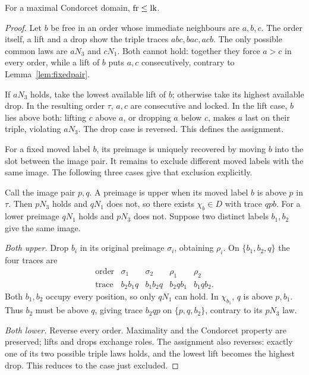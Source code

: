 \begin{proposition}\label{prop:injection}
For a maximal Condorcet domain, \(\operatorname{fr}\leq\operatorname{lk}\).
\end{proposition}
\begin{proof}
Let \(b\) be free in an order whose immediate neighbours are \(a,b,c\).
The order itself, a lift and a drop show the triple traces
\(abc,bac,acb\). The only possible common laws are \(aN_3\) and
\(cN_1\). Both cannot hold: together they force \(a>c\) in every
order, while a lift of \(b\) puts \(a,c\) consecutively, contrary
to Lemma~\ref{lem:fixedpair}.

If \(aN_3\) holds, take the lowest available lift of \(b\); otherwise
take its highest available drop. In the resulting order \(\tau\),
\(a,c\) are consecutive and locked. In the lift case, \(b\) lies
above both: lifting \(c\) above \(a\), or dropping \(a\) below
\(c\), makes \(a\) last on their triple, violating \(aN_3\).
The drop case is reversed. This defines the assignment.

For a fixed moved label \(b\), its preimage is uniquely recovered
by moving \(b\) into the slot between the image pair. It remains to
exclude different moved labels with the same image. The following
three cases give that exclusion explicitly.

Call the image pair \(p,q\). A preimage is upper when its moved label
\(b\) is above \(p\) in \(\tau\). Then \(pN_3\) holds and
\(qN_1\) does not, so there exists \(\chi_b\in D\) with trace
\(qpb\). For a lower preimage \(qN_1\) holds and \(pN_3\) does not.
Suppose two distinct labels \(b_1,b_2\) give the same image.

\emph{Both upper.} Drop \(b_i\) in its original preimage \(\sigma_i\),
obtaining \(\rho_i\). On \(\{b_1,b_2,q\}\) the four traces are
\[
 \begin{array}{c|cccc}
  \text{order}&\sigma_1&\sigma_2&\rho_1&\rho_2\\\hline
  \text{trace}&b_2b_1q&b_1b_2q&b_2qb_1&b_1qb_2.
 \end{array}
\]
Both \(b_1,b_2\) occupy every position, so only \(qN_1\) can hold.
In \(\chi_{b_1}\), \(q\) is above \(p,b_1\). Thus \(b_2\)
must be above \(q\), giving trace \(b_2qp\) on \(\{p,q,b_2\}\),
contrary to its \(pN_3\) law.

\emph{Both lower.} Reverse every order. Maximality and the Condorcet
property are preserved; lifts and drops exchange roles. The assignment
also reverses: exactly one of its two possible triple laws holds, and
the lowest lift becomes the highest drop. This reduces to the case
just excluded.


\end{proof}
